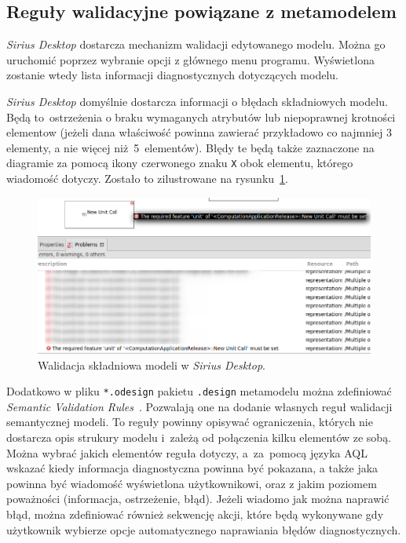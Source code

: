 \subsection{Reguły walidacyjne powiązane z
	metamodelem}\label{sec:reguly-walidacyjne-metamodel}

\emph{Sirius Desktop} dostarcza mechanizm walidacji edytowanego modelu. Można
go uruchomić poprzez wybranie opcji  z głównego menu
programu. Wyświetlona zostanie wtedy lista informacji diagnostycznych
dotyczących modelu.

\emph{Sirius Desktop} domyślnie dostarcza informacji o błędach składniowych
modelu. Będą to~ostrzeżenia o braku wymaganych atrybutów lub niepoprawnej
krotności elementow (jeżeli dana właściwość powinna zawierać przykładowo co
najmniej 3 elementy, a nie więcej niż~5~elementów). Błędy te będą także
zaznaczone na diagramie za pomocą ikony czerwonego znaku \texttt{X} obok
elementu, którego wiadomość dotyczy. Zostało to zilustrowane na
rysunku~\ref{rys:sirius-desktop-syntax-validation}.

\begin{figure}[!hb]
	\centering

	\includegraphics[width=0.95\linewidth]{./images/sirius-desktop-syntax-validation.png}
	\caption{Walidacja składniowa modeli w \emph{Sirius
  Desktop}.}\label{rys:sirius-desktop-syntax-validation}
\end{figure}

Dodatkowo w pliku \texttt{*.odesign} pakietu \texttt{.design} metamodelu można
zdefiniować \emph{Semantic Validation
	Rules}~\cite{sirius-desktop-documentation-validation-rules}.
Pozwalają one na dodanie własnych reguł walidacji semantycznej modeli. To
reguły powinny opisywać ograniczenia, których nie dostarcza opis strukury
modelu i~zależą od połączenia kilku elementów ze sobą. Można
wybrać jakich elementów reguła dotyczy, a~za~pomocą języka \gls{AQL} wskazać
kiedy informacja diagnostyczna powinna być pokazana, a także jaka powinna być
wiadomość wyświetlona użytkownikowi, oraz z jakim poziomem poważności
(informacja, ostrzeżenie, błąd). Jeżeli wiadomo jak można naprawić błąd, można
zdefiniować również sekwencję akcji, które będą wykonywane gdy użytkownik
wybierze
opcje automatycznego naprawiania błędów diagnostycznych.

